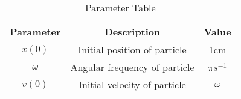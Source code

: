 
\begin{table}[h]
  \centering
  \begin{tabular}{|c|c|c|}
    \hline
Parameter & Description & Value \\ \hline
$x(0)$ & Initial position of particle & 1cm\\ \hline
$\omega$ & Angular frequency of particle & $\pi s^{-1}$ \\ \hline
$v(0)$ & Initial velocity of particle & $\omega$ \\ \hline
  \end{tabular}
  \vspace{2mm}
  \caption{Parameter Table}
\end{table}


